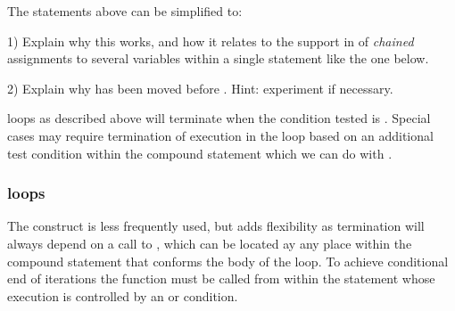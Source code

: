 \documentclass[krantz2]{krantz}\usepackage{knitr}%
\begin{document}
\begin{advplayground}
The statements above can be simplified to:

\begin{knitrout}\footnotesize
{}\color{fgcolor}\begin{kframe}
\begin{alltt}
 \hlkwb{<-} 
  \hlopt{<} \hlstd{) \{} \hlkwb{<-} \hlopt{^}\hlstd{)\}}
\end{alltt}
\end{kframe}
\end{knitrout}

1) Explain why this works, and how it relates to the support in \Rlang of \emph{chained} assignments to several variables within a single statement like the one below.

\begin{knitrout}\footnotesize
{}\color{fgcolor}\begin{kframe}
\begin{alltt}
 \hlkwb{<-}  \hlkwb{<-}  \hlkwb{<-} \hlopt{:}
\end{alltt}
\end{kframe}
\end{knitrout}

2) Explain why  has been moved before . Hint: experiment if necessary.
\end{advplayground}

\begin{explainbox}
 loops as described above will terminate when the condition tested is . Special cases may require termination of execution in the loop based on an additional test condition within the compound statement which we can do with .
\end{explainbox}

\subsubsection[\texttt{repeat} loops]{ loops}
The  construct is less frequently used, but adds flexibility as termination will always depend on a call to , which can be located ay any place within the compound statement that conforms the body of the loop. To achieve conditional end of iterations the  function must be called from within the statement whose execution is controlled by an  or  condition.
\end{document}
